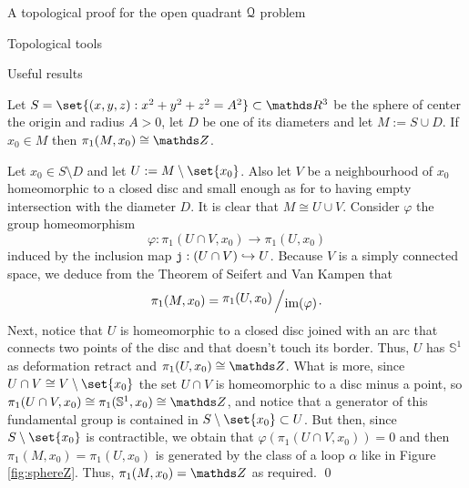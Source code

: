 \documentclass[11pt, a4paper, english, twoside, notitlepage, openright]{report}
\begin{document}
\begin{chapter}{A topological proof for the open quadrant $\mathcal{Q}$ problem}
\begin{section}{Topological tools}
\begin{subsection}{Useful results}
\begin{lemma}\label{lemmaZ}
Let $S=\set{(x,y,z):x^2+y^2+z^2=A^2}\subset\R^3$ be the sphere of center the origin and radius $A > 0$, let $D$ be one of its diameters and let $M := S\cup D$. If $x_0\in M$ then $\pi_1(M,x_0)\cong\Z$.
\begin{Proof}
Let $x_0\in S\setminus D$ and let $U := M\setminus\set{x_0}$. Also let $V$ be a neighbourhood of $x_0$ homeomorphic to a closed disc and small enough as for to having empty intersection with the diameter $D$. It is clear that $M\cong U\cup V$. Consider $\varphi$ the group homeomorphism
$$
\varphi: \pi_1(U\cap V, x_0) \longrightarrow \pi_1(U, x_0)
$$
induced by the inclusion map ${\tt j}: (U\cap V)\hookrightarrow U$. Because $V$ is a simply connected space, we deduce from the Theorem of Seifert and Van Kampen \cite[Chapter IV: $\mathsection$4, page 95]{m} that 
$$
\pi_1(M, x_0) = \bigslant{\pi_1(U, x_0)}{\text{im}(\varphi)}.
$$
Next, notice that $U$ is homeomorphic to a closed disc joined with an arc that connects two points of the disc and that doesn't touch its border. Thus, $U$ has $\mathbb{S}^1$ as deformation retract and $\pi_1(U, x_0)\cong \Z$. What is more, since $U\cap V \cong V\setminus\set{x_0}$ the set $U\cap V$ is homeomorphic to a disc minus a point, so $\pi_1(U\cap V, x_0)\cong \pi_1(\mathbb{S}^1,x_0) \cong \Z$, and notice that a generator of this fundamental group is contained in $S\setminus\set{x_0}\subset U$. But then, since $S\setminus\set{x_0}$ is contractible, we obtain that $\varphi(\pi_1(U\cap V, x_0))=0$ and then $\pi_1(M, x_0) = \pi_1(U, x_0)$ is generated by the class of a loop $\alpha$ like in Figure \ref{fig:sphereZ}. Thus, $\pi_1(M, x_0)=\Z$ as required.
\qed
\end{Proof}
\end{lemma}


\end{subsection}
\end{section}
\end{chapter}
\end{document}
